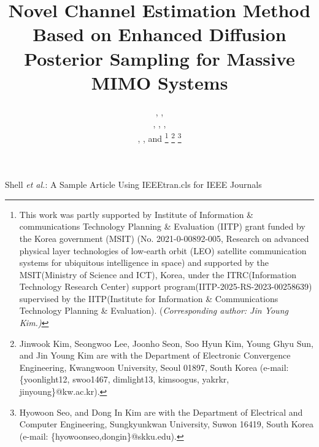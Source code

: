 \documentclass[lettersize,journal]{IEEEtran}
\begin{document}
\title{Novel Channel Estimation Method Based on Enhanced Diffusion Posterior Sampling for Massive MIMO Systems}

\author{,  ,

, , ,

, , and 
\thanks{This work was 
partly supported by Institute of Information \& communications Technology Planning \& Evaluation (IITP) grant funded by the Korea government (MSIT) (No. 2021-0-00892-005, Research on advanced physical layer technologies of low-earth orbit (LEO) satellite communication systems for ubiquitous intelligence in space) and 
supported by the MSIT(Ministry of Science and ICT), Korea, under the ITRC(Information Technology Research Center) support program(IITP-2025-RS-2023-00258639) supervised by the IITP(Institute for Information \& Communications Technology Planning \& Evaluation). (\it{Corresponding author: Jin Young Kim.})}%
\thanks{Jinwook Kim, Seongwoo Lee, Joonho Seon, Soo Hyun Kim, Young Ghyu Sun, and Jin Young Kim are with the Department of Electronic Convergence Engineering, Kwangwoon University, Seoul 01897, South Korea (e-mail: \{yoonlight12, swoo1467, dimlight13, kimsoogus, yakrkr, jinyoung\}@kw.ac.kr).}
\thanks{Hyowoon Seo, and Dong In Kim are with the Department of Electrical and Computer Engineering, Sungkyunkwan University, Suwon 16419, South Korea (e-mail: \{hyowoonseo,dongin\}@skku.edu).}}


%
{Shell \MakeLowercase{\textit{et al.}}: A Sample Article Using IEEEtran.cls for IEEE Journals}
\end{document}

